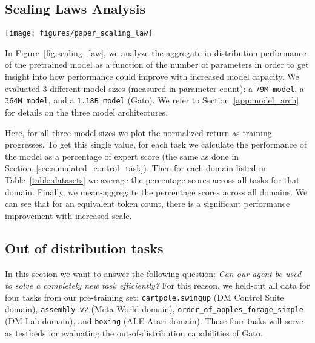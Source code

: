 \documentclass[10pt]{article} \usepackage[accepted]{tmlr}
\newcommand{\model}{{Gato}}
\newcommand{\dmlab}{{DM Lab}}
\newcommand{\atari}{{ALE Atari}}
\newcommand{\dmcontrol}{{DM Control Suite}}
\newcommand{\metaworld}{{Meta-World}}
\begin{document}
\subsection{Scaling Laws Analysis}\label{sec:scaling_law_analysis}
\vskip 0.2cm
\begin{figure*}[bp]
    \centering
    \texttt{[image: figures/paper\_scaling\_law]}
    \caption{
    {\bf Model size scaling laws results.} In-distribution performance as a function of tokens processed for 3 model scales. 
    Performance is first mean-aggregated within each separate control domain, and then mean-aggregated across all domains.
    We can see a consistent improvement as model capacity is increased for a fixed number of tokens.
    }
    \label{fig:scaling_law}
\end{figure*}

In Figure~\ref{fig:scaling_law}, we analyze the aggregate in-distribution performance of the pretrained model as a function of the number of parameters in order to get insight into how performance could improve with increased model capacity.
We evaluated 3 different model sizes (measured in  parameter count):
a \texttt{79M model}, 
a \texttt{364M model},
and a \texttt{1.18B model} (\model{}). 
We refer to Section~\ref{app:model_arch} for details on the three model architectures.

Here, for all three model sizes we plot the normalized return as training progresses.
To get this single value, for each task we calculate the performance of the model as a percentage of expert score (the same as done in Section~\ref{sec:simulated_control_task}).
Then for each domain listed in Table~\ref{table:datasets} we average the percentage scores across all tasks for that domain.
Finally, we mean-aggregate the percentage scores across all domains.
We can see that for an equivalent token count, there is a significant performance improvement with increased scale.
\vskip 0.4cm
\subsection{Out of distribution tasks}\label{sec:ood_results}
\vskip 0.2cm
In this section we want to answer the following question: \emph{Can our agent be used to solve a completely new task efficiently?}
For this reason, we held-out all data for four tasks from our pre-training set: \texttt{cartpole.swingup} (\dmcontrol{} domain), \texttt{assembly-v2} (\metaworld{} domain), \texttt{order\_of\_apples\_forage\_simple} (\dmlab{} domain), and \texttt{boxing} (\atari{} domain).
These four tasks will serve as testbeds for evaluating the out-of-distribution capabilities of \model{}.
\end{document}
